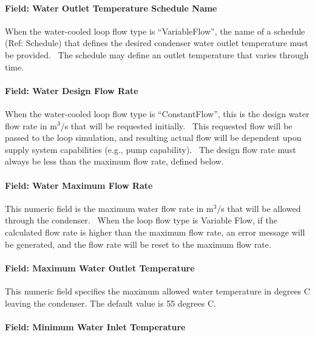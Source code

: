 \paragraph{Field: Water Outlet Temperature Schedule Name}\label{field-water-outlet-temperature-schedule-name}

When the water-cooled loop flow type is ``VariableFlow'', the name of a schedule (Ref: Schedule) that defines the desired condenser water outlet temperature must be provided.~ The schedule may define an outlet temperature that varies through time.

\paragraph{Field: Water Design Flow Rate}\label{field-water-design-flow-rate}

When the water-cooled loop flow type is ``ConstantFlow'', this is the design water flow rate in m\(^{3}\)/s that will be requested initially.~ This requested flow will be passed to the loop simulation, and resulting actual flow will be dependent upon supply system capabilities (e.g., pump capability).~ The design flow rate must always be less than the maximum flow rate, defined below.

\paragraph{Field: Water Maximum Flow Rate}\label{field-water-maximum-flow-rate}

This numeric field is the maximum water flow rate in m\(^{3}\)/s that will be allowed through the condenser.~ When the loop flow type is Variable Flow, if the calculated flow rate is higher than the maximum flow rate, an error message will be generated, and the flow rate will be reset to the maximum flow rate.

\paragraph{Field: Maximum Water Outlet Temperature}\label{field-maximum-water-outlet-temperature}

This numeric field specifies the maximum allowed water temperature in degrees C leaving the condenser. The default value is 55 degrees C.

\paragraph{Field: Minimum Water Inlet Temperature}\label{field-minimum-water-inlet-temperature}

